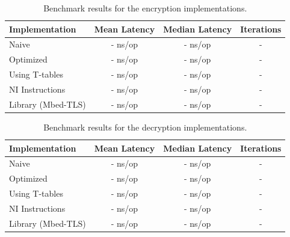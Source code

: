 \begin{table}[H]
    \caption{Benchmark results for the encryption implementations.}
    \label{benchmark_encryption_table}
    \begin{center}
        \begin{tabular}{|l|c|c|c|}
            \hline
                \textbf{Implementation} &
                \textbf{Mean Latency} &
                \textbf{Median Latency} &
                \textbf{Iterations} \\ [0.5ex]
            \hline\hline
                Naive &
                - ns/op &
                - ns/op &
                - \\
            \hline
                Optimized &
                - ns/op &
                - ns/op &
                - \\
            \hline
                Using T-tables &
                - ns/op &
                - ns/op &
                - \\
            \hline
                NI Instructions &
                - ns/op &
                - ns/op &
                - \\
            \hline
                Library (Mbed-TLS) &
                - ns/op &
                - ns/op &
                - \\
            \hline
        \end{tabular}
    \end{center}
\end{table}

\begin{table}[H]
    \caption{Benchmark results for the decryption implementations.}
    \label{benchmark_decryption_table}
    \begin{center}
        \begin{tabular}{|l|c|c|c|}
            \hline
                \textbf{Implementation} &
                \textbf{Mean Latency} &
                \textbf{Median Latency} &
                \textbf{Iterations} \\ [0.5ex]
            \hline\hline
                Naive &
                - ns/op &
                - ns/op &
                - \\
            \hline
                Optimized &
                - ns/op &
                - ns/op &
                - \\
            \hline
                Using T-tables &
                - ns/op &
                - ns/op &
                - \\
            \hline
                NI Instructions &
                - ns/op &
                - ns/op &
                - \\
            \hline
                Library (Mbed-TLS) &
                - ns/op &
                - ns/op &
                - \\
            \hline
        \end{tabular}
    \end{center}
\end{table}

